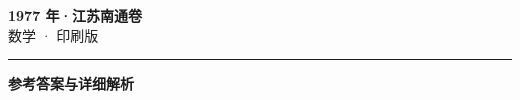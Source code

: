 \documentclass[zihao=5, a4paper]{ctexart}
\begin{document}
\begin{center}
  {\Large\bfseries 1977 年·江苏南通卷}\\[4pt]
  {\large 数学 · 印刷版}
\end{center}
\medskip
{}

\par\bigskip\hrule\bigskip
{}
\begin{center}{\large\bfseries 参考答案与详细解析}\end{center}
\smallskip

\end{document}
